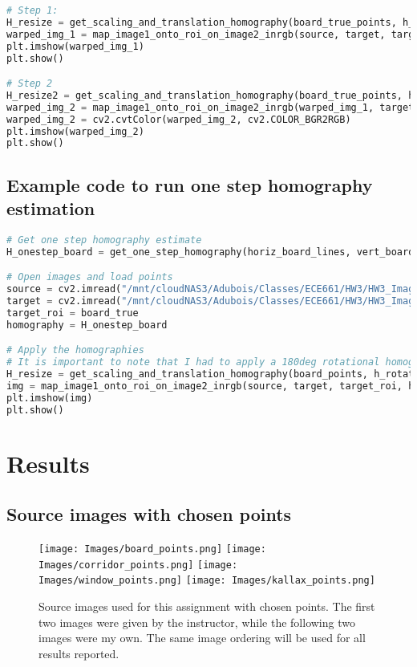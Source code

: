 \documentclass{article}
\begin{document}
\begin{lstlisting}[language=Python]
# Step 1:
H_resize = get_scaling_and_translation_homography(board_true_points, h_board_proj, (target.shape[1], target.shape[0]))
warped_img_1 = map_image1_onto_roi_on_image2_inrgb(source, target, target_roi, H_resize@h_board_proj)
plt.imshow(warped_img_1)
plt.show()

# Step 2
H_resize2 = get_scaling_and_translation_homography(board_true_points, h_board_aff, (target.shape[1], target.shape[0]))
warped_img_2 = map_image1_onto_roi_on_image2_inrgb(warped_img_1, target, target_roi, H_resize2@h_board_aff)
warped_img_2 = cv2.cvtColor(warped_img_2, cv2.COLOR_BGR2RGB)
plt.imshow(warped_img_2)
plt.show()
\end{lstlisting}

\subsection{Example code to run one step homography estimation}
\begin{lstlisting}[language=Python]
# Get one step homography estimate
H_onestep_board = get_one_step_homography(horiz_board_lines, vert_board_lines)

# Open images and load points
source = cv2.imread("/mnt/cloudNAS3/Adubois/Classes/ECE661/HW3/HW3_Images/board_1.jpeg")
target = cv2.imread("/mnt/cloudNAS3/Adubois/Classes/ECE661/HW3/HW3_Images/board_1.jpeg")
target_roi = board_true
homography = H_onestep_board

# Apply the homographies
# It is important to note that I had to apply a 180deg rotational homography to get this step to work
H_resize = get_scaling_and_translation_homography(board_points, h_rotate@homography, (target.shape[1], target.shape[0]))
img = map_image1_onto_roi_on_image2_inrgb(source, target, target_roi, h_rotate@H_resize@homography)
plt.imshow(img)
plt.show()
\end{lstlisting}

\section{Results}
\subsection{Source images with chosen points}
\begin{figure}[H]
    \centering
    \texttt{[image: Images/board\_points.png]}
    \texttt{[image: Images/corridor\_points.png]}
    \texttt{[image: Images/window\_points.png]}
    \texttt{[image: Images/kallax\_points.png]}
    \caption{Source images used for this assignment with chosen points. The first two images were given by the instructor, while the following two images were my own. The same image ordering will be used for all results reported.}
    \label{fig:enter-label}
\end{figure}
\end{document}
